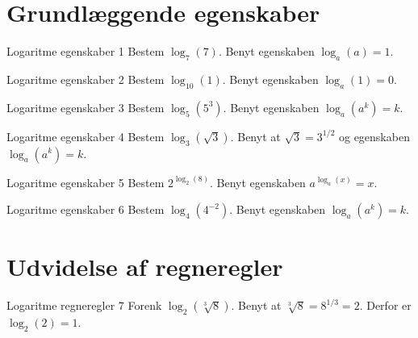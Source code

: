 \documentclass{article}
\begin{document}
\tableofcontents
\newpage

\section*{Grundl\ae{}ggende egenskaber}

\begin{exercise}{Logaritme egenskaber 1}
Bestem $\log_{7}(7)$.
\hint
Benyt egenskaben $\log_a(a) = 1$.
\end{exercise}

\newpage

\begin{exercise}{Logaritme egenskaber 2}
Bestem $\log_{10}(1)$.
\hint
Benyt egenskaben $\log_a(1) = 0$.
\end{exercise}

\newpage

\begin{exercise}{Logaritme egenskaber 3}
Bestem $\log_{5}(5^3)$.
\hint
Benyt egenskaben $\log_a(a^k) = k$.
\end{exercise}

\newpage

\begin{exercise}{Logaritme egenskaber 4}
Bestem $\log_{3}(\sqrt{3})$.
\hint
Benyt at $\sqrt{3} = 3^{1/2}$ og egenskaben $\log_a(a^k) = k$.
\end{exercise}

\newpage

\begin{exercise}{Logaritme egenskaber 5}
Bestem $2^{\log_2(8)}$.
\hint
Benyt egenskaben $a^{\log_a(x)} = x$.
\end{exercise}

\newpage

\begin{exercise}{Logaritme egenskaber 6}
Bestem $\log_{4}(4^{-2})$. 
\hint
Benyt egenskaben $\log_a(a^k) = k$.
\end{exercise}

\newpage

\section*{Udvidelse af regneregler}

\begin{exercise}{Logaritme regneregler 7}
Forenk $\log_2(\sqrt[3]{8})$. 
\hint
Benyt at $\sqrt[3]{8} = 8^{1/3} = 2$.
\hint
Derfor er $\log_2(2) = 1$.
\end{exercise}
\end{document}
